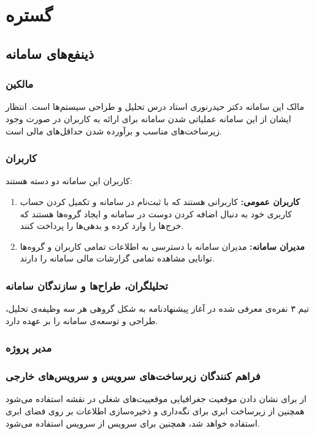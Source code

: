 
\makeatletter
\def\titlefootnote{\ifx\protect\@typeset@protect\expandafter\LTRfootnote\else\expandafter\@gobble\fi}
\makeatother

\chapter{گستره}
	\section{ذینفع‌های سامانه \titlefootnote{Stakeholders}
	}
	\subsection{مالکین}
	مالک این سامانه دکتر حیدرنوری استاد درس تحلیل و طراحی سیستم‌ها است. انتظار ایشان از این سامانه عملیاتی شدن سامانه برای ارائه به کاربران در صورت وجود زیرساخت‌های مناسب و برآورده شدن حداقل‌های مالی است.
	
	\subsection{کاربران}
کاربران این سامانه دو دسته هستند:
\begin{enumerate}
\item \textbf{کاربران عمومی:}
	کاربرانی هستند که با ثبت‌نام در سامانه و تکمیل کردن حساب کاربری خود به دنبال اضافه کردن دوست در  سامانه و ایجاد گروه‌ها هستند که خرج‌ها را وارد کرده و بدهی‌ها را پرداخت کنند.

\item \textbf{مدیران سامانه:}
مدیران سامانه با دسترسی به اطلاعات تمامی کاربران و گروه‌ها توانایی مشاهده تمامی گزارشات مالی سامانه را دارند.
\end{enumerate}

\subsection{تحلیلگران، طراح‌ها و سازندگان سامانه}

تیم ۳ نفره‌ی معرفی شده در آغاز پیشنهادنامه به شکل گروهی هر سه وظیفه‌ی تحلیل، طراحی و توسعه‌ی سامانه را بر عهده دارد.

\subsection{مدیر پروژه}

\subsection{فراهم کنندگان زیرساخت‌های سرویس و سرویس‌های خارجی}
از 
برای نشان دادن موقعیت جغرافیایی موقعییت‌های شغلی در نقشه استفاده می‌شود همچنین از زیرساخت ابری  برای نگه‌داری و ذخیره‌سازی اطلاعات بر روی فضای ابری استفاده خواهد شد، همچنین برای سرویس  از سرویس  استفاده می‌شود.

